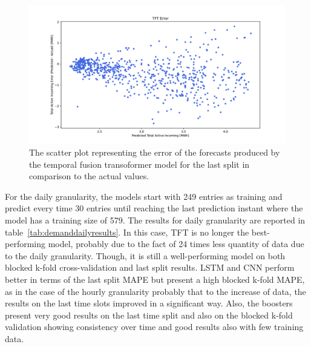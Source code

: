 \begin{figure}[H]
\centering
\includegraphics[width=1\textwidth]{images/demand/TFT_error_scatter_plot_predicted}
\caption{The scatter plot representing the error of the forecasts produced by the temporal fusion transoformer model for the last split in comparison to the actual values.}
\label{fig:demandtfthourlyforecastsscatterplot}
\end{figure}

For the daily granularity, the models start with 249 entries as training and predict every time 30 entries until reaching the last prediction instant where the model has a training size of 579.
The results for daily granularity are reported in table~\ref{tab:demanddailyresults}.
In this case, TFT is no longer the best-performing model, probably due to the fact of 24 times less quantity of data due to the daily granularity.
Though, it is still a well-performing model on both blocked k-fold cross-validation and last split results.
LSTM and CNN perform better in terms of the last split MAPE but present a high blocked k-fold MAPE, as in the case of the hourly granularity probably that to the increase of data, the results on the last time slots improved in a significant way.
Also, the boosters present very good results on the last time split and also on the blocked k-fold validation showing consistency over time and good results also with few training data. 

